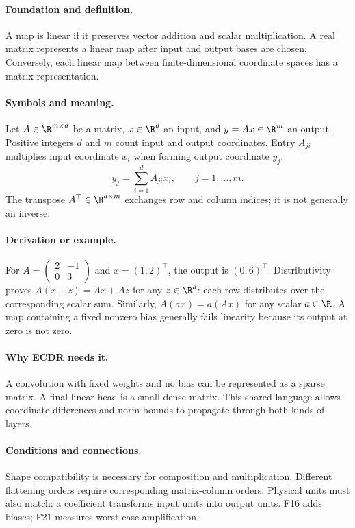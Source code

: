 \paragraph{Foundation and definition.}
A map is linear if it preserves vector addition and scalar
multiplication. A real matrix represents a linear map after input and
output bases are chosen. Conversely, each linear map between
finite-dimensional coordinate spaces has a matrix representation.
\paragraph{Symbols and meaning.}
Let $A\in\R^{m\times d}$ be a matrix, $x\in\R^d$ an input, and
$y=Ax\in\R^m$ an output. Positive integers $d$ and $m$ count input
and output coordinates. Entry $A_{ji}$ multiplies input coordinate
$x_i$ when forming output coordinate $y_j$:
\[
 y_j=\sum_{i=1}^{d}A_{ji}x_i,
 \qquad j=1,\ldots,m.
\]
The transpose $A^\top\in\R^{d\times m}$ exchanges row and column
indices; it is not generally an inverse.
\paragraph{Derivation or example.}
For
$A=\begin{pmatrix}2&-1\\0&3\end{pmatrix}$ and $x=(1,2)^\top$,
the output is $(0,6)^\top$. Distributivity proves
$A(x+z)=Ax+Az$ for any $z\in\R^d$: each row distributes over the
corresponding scalar sum. Similarly, $A(a x)=a(Ax)$ for any scalar
$a\in\R$. A map containing a fixed nonzero bias generally fails
linearity because its output at zero is not zero.
\paragraph{Why ECDR needs it.}
A convolution with fixed weights and no bias can be represented as a
sparse matrix. A final linear head is a small dense matrix. This shared
language allows coordinate differences and norm bounds to propagate
through both kinds of layers.
\paragraph{Conditions and connections.}
Shape compatibility is necessary for composition and multiplication.
Different flattening orders require corresponding matrix-column orders.
Physical units must also match: a coefficient transforms input units
into output units. F16 adds biases; F21 measures worst-case amplification.

